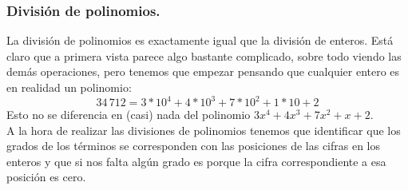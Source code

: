 \documentclass[a4paper,11pt,answers]{exam}
\begin{document}
   \subsubsection{División de polinomios.}
   La división de polinomios es exactamente igual que la división de enteros. Está claro que a primera vista parece algo bastante complicado, sobre todo viendo las demás operaciones, pero tenemos que empezar pensando que cualquier entero es en realidad un polinomio:
   \[34\,712 = 3*10^4 + 4* 10^3 + 7* 10^2 + 1*10 + 2\]
   Esto no se diferencia en (casi) nada del polinomio $3x^4 + 4x^3 + 7x^2 + x + 2$.\\

   A la hora de realizar las divisiones de polinomios tenemos que identificar que los grados de los términos se corresponden con las posiciones de las cifras en los enteros y que si nos falta algún grado es porque la cifra correspondiente a esa posición es cero.\\
\end{document}
